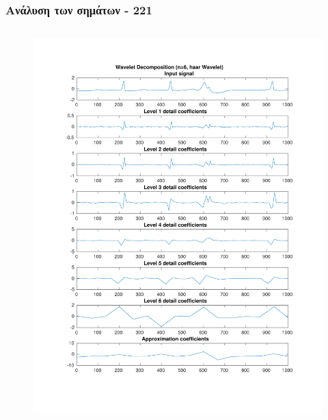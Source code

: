 \documentclass{beamer}
\begin{document}
\begin{frame}
\frametitle{Ανάλυση των σημάτων - 221}

\begin{columns}
\begin{figure}
\includegraphics[width=\textwidth]{fig/221l1_dwt1.pdf}
\end{figure}


\end{columns}
\end{frame}
\end{document}
